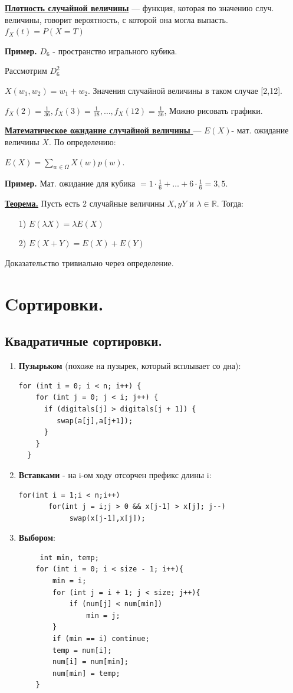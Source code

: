\documentclass{article}
\newcommand{\deff}[1]{\underline{\textbf{#1}}}
\newcommand{\thmm}[1]{\underline{\textbf{#1}}}
\begin{document}
\deff{Плотность случайной величины} --- функция, которая по значению случ. величины, говорит вероятность, с которой она могла выпасть. $f_X(t) = P(X=T)$

\textbf{Пример.} $D_6$ - пространство игрального кубика.

Рассмотрим $D_6^2$

$X(w_1,w_2)=w_1+w_2$. Значения случайной величины в таком случае [2,12]. 

$f_X(2) = \frac{1}{36}, f_X(3)=\frac{1}{18}, \ldots, f_X(12)=\frac{1}{36}$, Можно рисовать графики.

\deff{Математическое ожидание случайной величины } --- $E(X)$- мат. ожидание величины $X$. По определению:

$E(X) = \sum\limits_{w \in \Omega} X(w)p(w)$.

\textbf{Пример.} Мат. ожидание для кубика $=1\cdot \frac{1}{6}+\ldots +6\cdot \frac{1}{6} = 3,5$.

\thmm{Теорема.} Пусть есть 2 случайные величины $X,yY$ и $\lambda \in \mathbb{R}$. Тогда:
\begin{enumerate}
    \item[1)] $E(\lambda X) = \lambda E(X)$
    \item[2)] $E(X+Y)=E(X)+E(Y)$
\end{enumerate}
Доказательство тривиально через определение.
\pagebreak
\section{Cортировки.}
\subsection*{Квадратичные сортировки.}
\begin{enumerate}
    \item \textbf{Пузырьком} (похоже на пузырек, который всплывает со дна):
    \begin{lstlisting}[mathescape]
   for (int i = 0; i < n; i++) {
    for (int j = 0; j < i; j++) {
      if (digitals[j] > digitals[j + 1]) {
         swap(a[j],a[j+1]);
      }
    }
  }
\end{lstlisting}
    \item \textbf{Вставками} - на i-ом ходу отсорчен префикс длины i:
    \begin{lstlisting}[mathescape]
    for(int i = 1;i < n;i++)     
	   for(int j = i;j > 0 && x[j-1] > x[j]; j--) 
			swap(x[j-1],x[j]);        
     \end{lstlisting}
    \item \textbf{Выбором}:
    \begin{lstlisting}
     int min, temp; 
    for (int i = 0; i < size - 1; i++){
        min = i;
        for (int j = i + 1; j < size; j++){
            if (num[j] < num[min])
                min = j;      
        }
        if (min == i) continue;  
        temp = num[i];      
        num[i] = num[min];
        num[min] = temp;
    }
    \end{lstlisting}
\end{enumerate}
\end{document}
